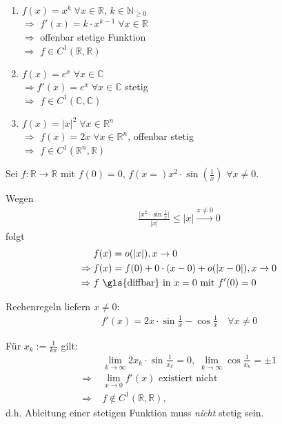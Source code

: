 \begin{example}
	\begin{enumerate}[label={\alph*)}]
		\item $f(x) = x^k\;\forall x\in\mathbb{R},\, k\in\mathbb{N}_{\ge 0}$ \\
		$\Rightarrow$ $f'(x) = k\cdot x^{k-1}\;\forall x\in \mathbb{R}$ \\
		$\Rightarrow$ offenbar stetige Funktion \\ $\Rightarrow$ $f\in C^1(\mathbb{R}, \mathbb{R})$
		
		\item $f(x) = e^x\;\forall x\in\mathbb{C}$ \\
		$\Rightarrow f'(x) = e^x \;\forall x\in\mathbb{C}$ stetig \\
		$\Rightarrow$ $f\in C^1(\mathbb{C},\mathbb{C})$
		
		\item $f(x) = \vert x \vert^2\;\forall x\in\mathbb{R}^n$ \\
		$\Rightarrow$ $f(x) = 2x\;\forall x\in\mathbb{R}^n$, offenbar stetig \\
		$\Rightarrow$ $f\in C^1(\mathbb{R}^n, \mathbb{R})$
	\end{enumerate}
\end{example}

\begin{example}
	Sei $f:\mathbb{R}\to \mathbb{R}$ mit $f(0) = 0$, $f(x= ) x^2\cdot \sin\left(\frac{1}{x}\right)$ $\forall x\neq 0$.
	
	Wegen \begin{align*}
		\frac{\vert x^2 \cdot \sin \frac{1}{x}\vert}{\vert x \vert} \le \vert x \vert \xrightarrow{x\neq 0} 0
	\end{align*}
	folgt{ \zeroAmsmathAlignVSpaces \begin{align*}
		& f(x) = o(\vert x \vert), x\to 0 \\
		\Rightarrow\;& f(x) = f(0) + 0\cdot (x - 0) + o(\vert x - 0\vert), x\to 0 \\
		\Rightarrow\;& f \text{ \gls{diffbar} in $x=0$ mit $f'(0) = 0$}
	\end{align*}}
	
	Rechenregeln liefern $x\neq 0$: \begin{align*}
		f'(x) = 2x\cdot\sin\frac{1}{x}- \cos\frac{1}{x} \quad\forall x\neq 0
	\end{align*}
	
	Für $x_k := \frac{1}{k\pi}$ gilt: \begin{align*}
		& \lim\limits_{k\to\infty} 2 x_k \cdot \sin \frac{1}{x_k} = 0,\; \lim\limits_{k\to\infty} \cos \frac{1}{x_k} = \pm 1 \\
		\Rightarrow\;& \lim\limits_{x\to 0} f'(x) \text{ existiert nicht} \\
		\Rightarrow\;& f\notin C^1(\mathbb{R}, \mathbb{R}),
	\end{align*}
	d.h. Ableitung einer stetigen Funktion muss \emph{nicht} stetig sein.
\end{example}

